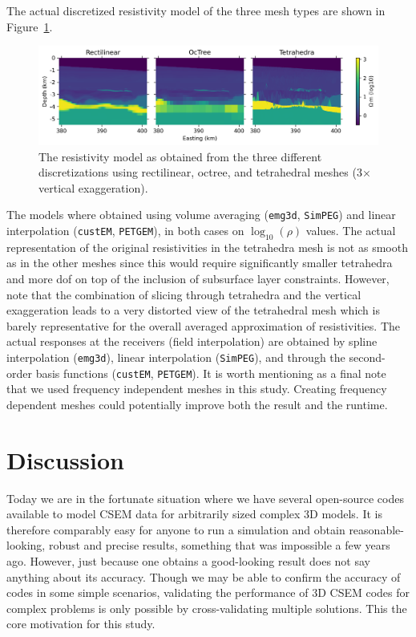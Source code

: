 \documentclass[extra, camera,%
]{gji}
\newcommand{\emg}[2]{\texttt{emg#1#2}\xspace}
\newcommand{\simpeg}{\texttt{SimPEG}\xspace}
\newcommand{\custem}{\texttt{custEM}\xspace}
\newcommand{\petgem}{\texttt{PETGEM}\xspace}
\begin{document}
The actual discretized resistivity model of the three mesh types are shown in Figure~\ref{fig:results-marlim_allmodels}.
%
\begin{figure}
  \centering
  \includegraphics[width=.9\linewidth]{figures/results-marlim_allmodels.png}
  \caption{The resistivity model as obtained from the three different discretizations using rectilinear, octree, and tetrahedral meshes (3$\times$ vertical exaggeration).}
  \label{fig:results-marlim_allmodels}
\end{figure}
%
The models where obtained using volume averaging (\emg3d, \simpeg) and linear interpolation (\custem, \petgem), in both cases on $\log_{10}(\rho)$ values. The actual representation of the original resistivities in the tetrahedra mesh is not as smooth as in the other meshes since this would require significantly smaller tetrahedra and more dof on top of the inclusion of subsurface layer constraints. However, note that the combination of slicing through tetrahedra and the vertical exaggeration leads to a very distorted view of the tetrahedral mesh which is barely representative for the overall averaged approximation of resistivities. The actual responses at the receivers (field interpolation) are obtained by spline interpolation (\emg3d), linear interpolation (\simpeg), and through the second-order basis functions (\custem, \petgem). It is worth mentioning as a final note that we used frequency independent meshes in this study. Creating frequency dependent meshes could potentially improve both the result and the runtime.


\section{Discussion}

Today we are in the fortunate situation where we have several open-source codes available to model CSEM data for arbitrarily sized complex 3D models. It is therefore comparably easy for anyone to run a simulation and obtain reasonable-looking, robust and precise results, something that was impossible a few years ago. However, just because one obtains a good-looking result does not say anything about its accuracy. Though we may be able to confirm the accuracy of codes in some simple scenarios, validating the performance of 3D CSEM codes for complex problems is only possible by cross-validating multiple solutions. This the core motivation for this study.
\end{document}
